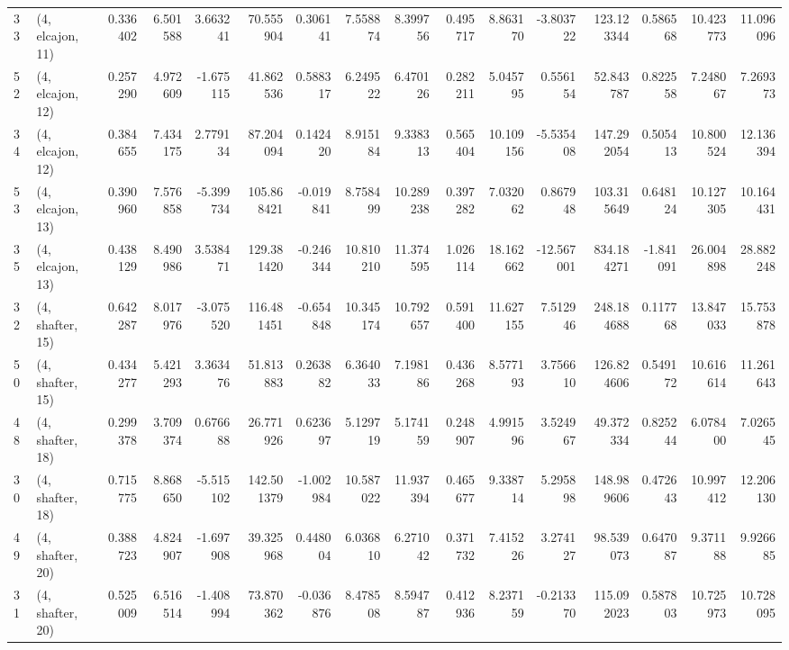\begin{tabular}{llrrrrrrrrrrrrrr}
33 &  (4, elcajon, 11) &   0.336402 &   6.501588 &  3.663241 &   70.555904 &  0.306141 &   7.558874 &   8.399756 &  0.495717 &   8.863170 &  -3.803722 &  123.123344 &  0.586568 &  10.423773 &  11.096096 \\
52 &  (4, elcajon, 12) &   0.257290 &   4.972609 & -1.675115 &   41.862536 &  0.588317 &   6.249522 &   6.470126 &  0.282211 &   5.045795 &   0.556154 &   52.843787 &  0.822558 &   7.248067 &   7.269373 \\
34 &  (4, elcajon, 12) &   0.384655 &   7.434175 &  2.779134 &   87.204094 &  0.142420 &   8.915184 &   9.338313 &  0.565404 &  10.109156 &  -5.535408 &  147.292054 &  0.505413 &  10.800524 &  12.136394 \\
53 &  (4, elcajon, 13) &   0.390960 &   7.576858 & -5.399734 &  105.868421 & -0.019841 &   8.758499 &  10.289238 &  0.397282 &   7.032062 &   0.867948 &  103.315649 &  0.648124 &  10.127305 &  10.164431 \\
35 &  (4, elcajon, 13) &   0.438129 &   8.490986 &  3.538471 &  129.381420 & -0.246344 &  10.810210 &  11.374595 &  1.026114 &  18.162662 & -12.567001 &  834.184271 & -1.841091 &  26.004898 &  28.882248 \\
32 &  (4, shafter, 15) &   0.642287 &   8.017976 & -3.075520 &  116.481451 & -0.654848 &  10.345174 &  10.792657 &  0.591400 &  11.627155 &   7.512946 &  248.184688 &  0.117768 &  13.847033 &  15.753878 \\
50 &  (4, shafter, 15) &   0.434277 &   5.421293 &  3.363476 &   51.813883 &  0.263882 &   6.364033 &   7.198186 &  0.436268 &   8.577193 &   3.756610 &  126.824606 &  0.549172 &  10.616614 &  11.261643 \\
48 &  (4, shafter, 18) &   0.299378 &   3.709374 &  0.676688 &   26.771926 &  0.623697 &   5.129719 &   5.174159 &  0.248907 &   4.991596 &   3.524967 &   49.372334 &  0.825244 &   6.078400 &   7.026545 \\
30 &  (4, shafter, 18) &   0.715775 &   8.868650 & -5.515102 &  142.501379 & -1.002984 &  10.587022 &  11.937394 &  0.465677 &   9.338714 &   5.295898 &  148.989606 &  0.472643 &  10.997412 &  12.206130 \\
49 &  (4, shafter, 20) &   0.388723 &   4.824907 & -1.697908 &   39.325968 &  0.448004 &   6.036810 &   6.271042 &  0.371732 &   7.415226 &   3.274127 &   98.539073 &  0.647087 &   9.371188 &   9.926685 \\
31 &  (4, shafter, 20) &   0.525009 &   6.516514 & -1.408994 &   73.870362 & -0.036876 &   8.478508 &   8.594787 &  0.412936 &   8.237159 &  -0.213370 &  115.092023 &  0.587803 &  10.725973 &  10.728095 \\
\bottomrule
\end{tabular}
